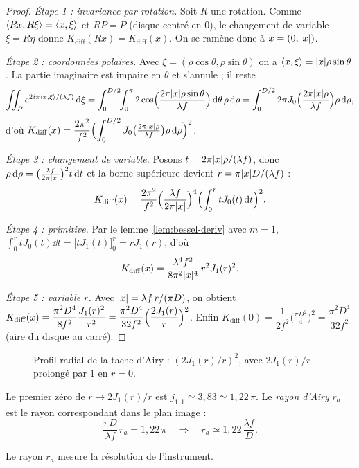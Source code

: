 \begin{proof}
  \emph{Étape 1 : invariance par rotation.} Soit $R$ une rotation. Comme $\langle Rx,R\xi\rangle=\langle x,\xi\rangle$ et $RP=P$ (disque centré en $0$), le changement de variable $\xi=R\eta$ donne $K_{\mathrm{diff}}(Rx)=K_{\mathrm{diff}}(x)$. On se ramène donc à $x=(0,\lvert x\rvert)$.

  \emph{Étape 2 : coordonnées polaires.} Avec $\xi=(\rho\cos\theta,\rho\sin\theta)$ on a $\langle x,\xi\rangle=\lvert x\rvert\rho\sin\theta$. La partie imaginaire est impaire en $\theta$ et s'annule ; il reste
  \[
    \iint_P e^{2i\pi\langle x,\xi\rangle/(\lambda f)}\mathop{}\!\mathrm{d}\xi
    =\int_0^{D/2}\!\!\int_{0}^{\pi}2\cos\Bigl(\frac{2\pi\lvert x\rvert\rho\sin\theta}{\lambda f}\Bigr)\mathop{}\!\mathrm{d}\theta\,\rho\mathop{}\!\mathrm{d}\rho
    =\int_0^{D/2}2\pi J_0\Bigl(\frac{2\pi\lvert x\rvert\rho}{\lambda f}\Bigr)\rho\mathop{}\!\mathrm{d}\rho ,
  \]
  d'où $K_{\mathrm{diff}}(x)=\dfrac{2\pi^2}{f^2}\Bigl(\displaystyle\int_0^{D/2}J_0\bigl(\tfrac{2\pi\lvert x\rvert\rho}{\lambda f}\bigr)\rho\mathop{}\!\mathrm{d}\rho\Bigr)^2$.

  \emph{Étape 3 : changement de variable.} Posons $t=2\pi\lvert x\rvert\rho/(\lambda f)$, donc $\rho\mathop{}\!\mathrm{d}\rho=\bigl(\tfrac{\lambda f}{2\pi\lvert x\rvert}\bigr)^2t\mathop{}\!\mathrm{d} t$ et la borne supérieure devient $r=\pi\lvert x\rvert D/(\lambda f)$ :
  \[
    K_{\mathrm{diff}}(x)=\frac{2\pi^2}{f^2}\Bigl(\frac{\lambda f}{2\pi\lvert x\rvert}\Bigr)^4\Bigl(\int_0^{r}tJ_0(t)\mathop{}\!\mathrm{d} t\Bigr)^2 .
  \]

  \emph{Étape 4 : primitive.} Par le lemme~\ref{lem:bessel-deriv} avec $m=1$, $\int_0^r tJ_0(t)\dd t=\bigl[tJ_1(t)\bigr]_0^r=rJ_1(r)$, d'où
  \[
    K_{\mathrm{diff}}(x)=\frac{\lambda^4f^2}{8\pi^2\lvert x\rvert^4}\,r^2J_1(r)^2 .
  \]

  \emph{Étape 5 : variable $r$.} Avec $\lvert x\rvert=\lambda f\,r/(\pi D)$, on obtient $K_{\mathrm{diff}}(x)=\dfrac{\pi^2D^4}{8f^2}\dfrac{J_1(r)^2}{r^2}=\dfrac{\pi^2D^4}{32f^2}\Bigl(\dfrac{2J_1(r)}{r}\Bigr)^2$.
  Enfin $K_{\mathrm{diff}}(0)=\dfrac{1}{2f^2}\bigl(\tfrac{\pi D^2}{4}\bigr)^2=\dfrac{\pi^2D^4}{32f^2}$ (aire du disque au carré).
\end{proof}

\begin{figure}[!htb]\centering
  
  \caption{Profil radial de la tache d'Airy : $(2J_1(r)/r)^2$, avec $2J_1(r)/r$ prolongé par $1$ en $r=0$.}\label{fig:airy-profile}
\end{figure}

\begin{definition}\label{def:rayon-airy}
  Le premier zéro de $r\mapsto2J_1(r)/r$ est $j_{1,1}\simeq3{,}83\simeq1{,}22\,\pi$. Le \emph{rayon d'Airy} $r_a$ est le rayon correspondant dans le plan image :
  \[
    \frac{\pi D}{\lambda f}\,r_a=1{,}22\,\pi\quad\Longrightarrow\quad r_a\simeq1{,}22\,\frac{\lambda f}{D}.
  \]
\end{definition}

Le rayon $r_a$ mesure la \og résolution\fg{} de l'instrument.

